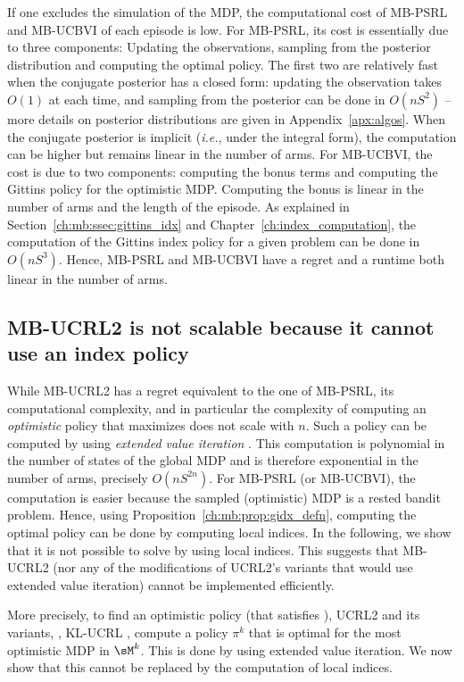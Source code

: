 If one excludes the simulation of the MDP, the computational cost of MB-PSRL and MB-UCBVI of each episode is low. For MB-PSRL, its cost is essentially due to three components: Updating the observations, sampling from the posterior distribution and computing the optimal policy. The first two are relatively fast when the conjugate posterior has a closed form: updating the observation takes $O(1)$ at each time, and sampling from the posterior can be done in $O(nS^2)$ -- more details on posterior distributions are given in Appendix~\ref{apx:algos}. When the conjugate posterior is implicit (\emph{i.e.}, under the integral form), the computation can be higher but remains linear in the number of arms. For MB-UCBVI, the cost is due to two components: computing the bonus terms and computing the Gittins policy for the optimistic MDP. Computing the bonus is linear in the number of arms and the length of the episode. As explained in Section~\ref{ch:mb:ssec:gittins_idx} and Chapter~\ref{ch:index_computation}, the computation of the Gittins index policy for a given problem can be done in $O(nS^3)$. Hence, MB-PSRL and MB-UCBVI have a regret and a runtime both linear in the number of arms.

\subsection{MB-UCRL2 is not scalable because it cannot use an index policy}
\label{ssec:no-OFU}

While MB-UCRL2 has a regret equivalent to the one of MB-PSRL, its computational complexity, and in particular the complexity of computing an \emph{optimistic} policy that maximizes  does not scale with $n$. Such a policy can be computed by using \emph{extended value iteration} \cite{jaksch2010near}. This computation is polynomial in the number of states of the global MDP and is therefore exponential in the number of arms, precisely $O(nS^{2n})$.
For MB-PSRL (or MB-UCBVI), the computation is easier because the sampled (optimistic) MDP is a rested bandit problem. Hence, using Proposition~\ref{ch:mb:prop:gidx_defn}, computing the optimal policy can be done by computing local indices. In the following, we show that it is not possible to solve  by using local indices. This suggests that MB-UCRL2 (nor any of the modifications of UCRL2's variants that would use extended value iteration) cannot be implemented efficiently.

More precisely, to find an optimistic policy (that satisfies ), UCRL2 and its variants, \eg, KL-UCRL \cite{filippi2010optimism}, compute a policy $\pi^k$ that is optimal for the most optimistic MDP in $\sM^k$. This is done by using extended value iteration. We now show that this cannot be replaced by the computation of local indices.

